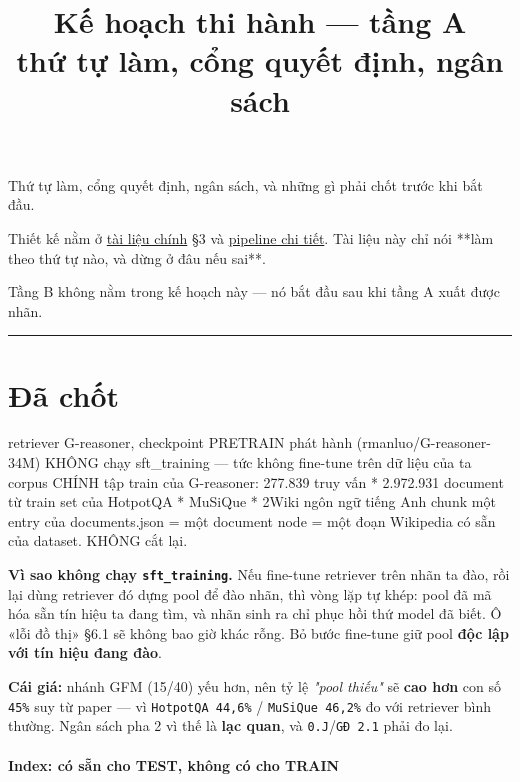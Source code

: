 \documentclass[11pt,a4paper]{article}
\title{\bfseries Kế hoạch thi hành --- tầng A\\[3pt]
       \large\mdseries thứ tự làm, cổng quyết định, ngân sách}
\author{}
\date{}
\begin{document}
\maketitle
\tableofcontents
\vspace{1em}


Thứ tự làm, cổng quyết định, ngân sách, và những gì phải chốt trước khi bắt đầu.

Thiết kế nằm ở \href{pipeline-shapley-ig-graph.md}{tài liệu chính} \S{}3 và
\href{tang-a-pipeline.md}{pipeline chi tiết}. Tài liệu này chỉ nói **làm theo thứ tự nào, và dừng ở
đâu nếu sai**.

Tầng B không nằm trong kế hoạch này — nó bắt đầu sau khi tầng A xuất được nhãn.

\vspace{0.3em}\hrule\vspace{0.6em}

\section{Đã chốt}

\begin{dia}
retriever      G-reasoner, checkpoint PRETRAIN phát hành (rmanluo/G-reasoner-34M)
               KHÔNG chạy sft_training — tức không fine-tune trên dữ liệu của ta
corpus         CHÍNH tập train của G-reasoner:
                   277.839 truy vấn * 2.972.931 document
                   từ train set của HotpotQA * MuSiQue * 2Wiki
ngôn ngữ       tiếng Anh
chunk          một entry của documents.json = một document node
               = một đoạn Wikipedia có sẵn của dataset.  KHÔNG cắt lại.
\end{dia}

\textbf{Vì sao không chạy \texttt{sft\_training}.} Nếu fine-tune retriever trên nhãn ta đào, rồi lại dùng
retriever đó dựng pool để đào nhãn, thì vòng lặp tự khép: pool đã mã hóa sẵn tín hiệu ta đang
tìm, và nhãn sinh ra chỉ phục hồi thứ model đã biết. Ô «lỗi đồ thị» \S{}6.1 sẽ không bao giờ khác
rỗng. Bỏ bước fine-tune giữ pool \textbf{độc lập với tín hiệu đang đào}.

\textbf{Cái giá:} nhánh GFM (15/40) yếu hơn, nên tỷ lệ \emph{"pool thiếu"} sẽ \textbf{cao hơn} con số \texttt{45\%}
suy từ paper — vì \texttt{HotpotQA 44,6\%} / \texttt{MuSiQue 46,2\%} đo với retriever bình thường. Ngân sách
pha 2 vì thế là \textbf{lạc quan}, và \texttt{0.J}/\texttt{GĐ 2.1} phải đo lại.

\paragraph{Index: có sẵn cho TEST, không có cho TRAIN}
\end{document}
